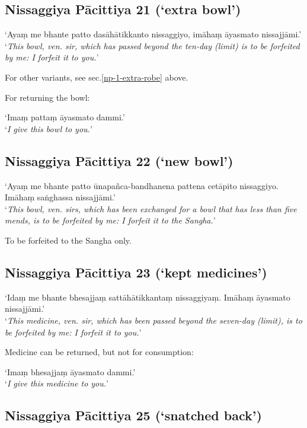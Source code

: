 \subsection{Nissaggiya Pācittiya 21 (‘extra bowl’)}

‘Ayaṃ me bhante patto dasāhātikkanto nissaggiyo, imāhaṃ āyasmato nissajjāmi.’\\
‘\emph{This bowl, ven. sir, which has passed beyond the ten-day (limit) is to be
  forfeited by me: I forfeit it to you.}’


For other variants, see sec.\ref{np-1-extra-robe} above.

For returning the bowl:

‘Imaṃ pattaṃ āyasmato dammi.’\\
‘\emph{I give this bowl to you.}’

\subsection{Nissaggiya Pācittiya 22 (‘new bowl’)}

‘Ayaṃ me bhante patto ūnapañca-bandhanena pattena cetāpito nissaggiyo. Imāhaṃ
saṅghassa nissajjāmi.’\\
‘\emph{This bowl, ven. sirs, which has been exchanged for a bowl that has less
  than five mends, is to be forfeited by me: I forfeit it to the Sangha.}’


To be forfeited to the Sangha only.

\subsection{Nissaggiya Pācittiya 23 (‘kept medicines’)}

‘Idaṃ me bhante bhesajjaṃ sattāhātikkantaṃ nissaggiyaṃ. Imāhaṃ āyasmato
nissajjāmi.’\\
‘\emph{This medicine, ven. sir, which has been passed beyond the seven-day
  (limit), is to be forfeited by me: I forfeit it to you.}’


Medicine can be returned, but not for consumption:

‘Imaṃ bhesajjaṃ āyasmato dammi.’\\
‘\emph{I give this medicine to you.}’

\subsection{Nissaggiya Pācittiya 25 (‘snatched back’)}

